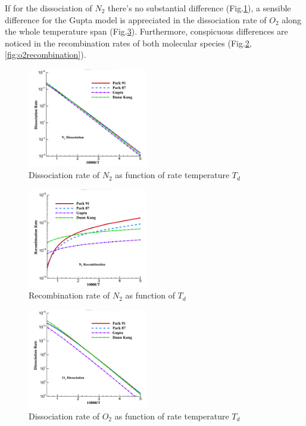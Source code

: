 \documentclass[11pt,a4paper,twocolumn]{article}
\begin{document}
If for the dissociation of $N_2$ there's no substantial difference (Fig.\ref{fig:n2dissociation}), a sensible difference for the Gupta model is appreciated in the dissociation rate of $O_2$ along the whole temperature span (Fig.\ref{fig:o2dissociation}). Furthermore, conspicuous differences are noticed in the recombination rates of both molecular species (Fig.\ref{fig:n2recombination},\ref{fig:o2recombination}). 

\begin{figure}[h]
    \centering
    \includegraphics[width=0.47\textwidth]{myimages/N2dissociation.png}
    \caption{Dissociation rate of $N_2$ as function of rate temperature $T_d$}
    \label{fig:n2dissociation}
\end{figure}

\begin{figure}[h]
    \centering
    \includegraphics[width=0.47\textwidth]{myimages/N2recombination.png}
    \caption{Recombination rate of $N_2$ as function of $T_d$}
    \label{fig:n2recombination}
\end{figure}

\begin{figure}[h]
    \centering
    \includegraphics[width=0.47\textwidth]{myimages/O2dissociation.png}
    \caption{Dissociation rate of $O_2$ as function of rate temperature $T_d$}
    \label{fig:o2dissociation}
\end{figure}
\end{document}
